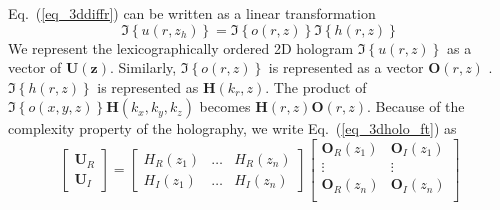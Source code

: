 \documentclass[9pt,twocolumn,twoside]{osajnl}
\begin{document}
Eq.~(\ref{eq_3ddiffr}) can be written as a linear transformation
\begin{equation}
\Im\left\{u(r,z_h)\right\} = \Im\left\{o(r,z)\right\} \Im\left\{h(r,z)\right\} \label{eq_3dholo_ft}
\end{equation}
We represent the lexicographically ordered 2D hologram $\Im\left\{u(r,z)\right\}$ as a vector of $\mathbf{U(z)}$. 
Similarly, $\Im\left\{o(r,z)\right\}$ is represented as a vector $\mathbf{O}(r,z)$ . $\Im\left\{h(r,z)\right\}$ is represented as $\mathbf{H}(k_r, z)$.
The product of $\Im\left\{o(x,y,z)\right\} \mathbf{H}(k_x,k_y,k_z)$ becomes $\mathbf{H}(r,z)\mathbf{O}(r,z)$.
Because of the complexity property of the holography, we write Eq.~(\ref{eq_3dholo_ft}) as
\begin{equation}
\begin{bmatrix}
\mathbf{U}_R \\ \mathbf{U}_I 
\end{bmatrix}
=\begin{bmatrix}
H_R(z_1) & \dots & H_R(z_n) \\
H_I(z_1) & \dots & H_I(z_n) 
\end{bmatrix}
\begin{bmatrix}
\mathbf{O}_R(z_1) & \mathbf{O}_I(z_1)\\ 
\vdots  & \vdots \\
\mathbf{O}_R(z_n) & \mathbf{O}_I(z_n) \\  
\end{bmatrix}
\end{equation}

\end{document}
